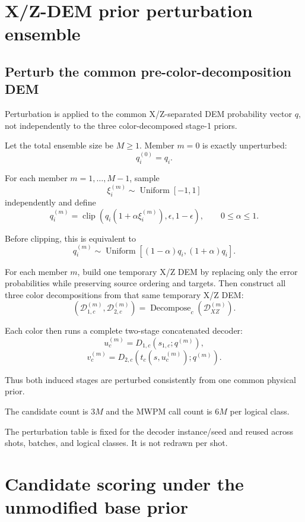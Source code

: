 \documentclass[11pt]{article}
\begin{document}
\section{X/Z-DEM prior perturbation ensemble}

\subsection{Perturb the common pre-color-decomposition DEM}

Perturbation is applied to the common X/Z-separated DEM probability vector $q$,
not independently to the three color-decomposed stage-1 priors.

Let the total ensemble size be $M\ge1$. Member $m=0$ is exactly unperturbed:
\[
    q_i^{(0)}=q_i.
    \tag{16}
\]

For each member $m=1,\ldots,M-1$, sample
\[
    \xi_i^{(m)}\sim\operatorname{Uniform}[-1,1]
\]
independently and define
\[
    q_i^{(m)}
    =
    \operatorname{clip}
    \left(
      q_i(1+\alpha\xi_i^{(m)}),
      \epsilon,
      1-\epsilon
    \right),
    \qquad
    0\le\alpha\le1.
    \tag{17}
\]

Before clipping, this is equivalent to
\[
    q_i^{(m)}
    \sim
    \operatorname{Uniform}
    \left[
      (1-\alpha)q_i,
      (1+\alpha)q_i
    \right].
\]

For each member $m$, build one temporary X/Z DEM by replacing only the error
probabilities while preserving source ordering and targets. Then construct all
three color decompositions from that same temporary X/Z DEM:
\[
    \left(
      \mathcal D_{1,c}^{(m)},
      \mathcal D_{2,c}^{(m)}
    \right)
    =
    \operatorname{Decompose}_c
    \left(
      \mathcal D_{XZ}^{(m)}
    \right).
    \tag{18}
\]

Each color then runs a complete two-stage concatenated decoder:
\[
    u_c^{(m)}
    =
    D_{1,c}(s_{1,c};q^{(m)}),
\]
\[
    v_c^{(m)}
    =
    D_{2,c}(t_c(s,u_c^{(m)});q^{(m)}).
    \tag{19}
\]

Thus both induced stages are perturbed consistently from one common physical
prior.

The candidate count is $3M$ and the MWPM call count is $6M$ per logical class.

The perturbation table is fixed for the decoder instance/seed and reused across
shots, batches, and logical classes. It is not redrawn per shot.

\section{Candidate scoring under the unmodified base prior}
\end{document}

